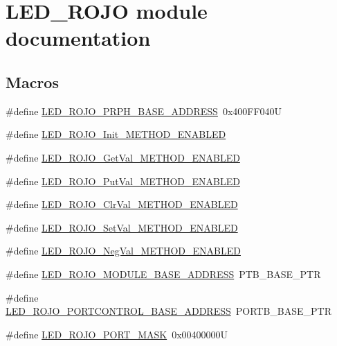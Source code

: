\hypertarget{group___l_e_d___r_o_j_o__module}{}\section{L\+E\+D\+\_\+\+R\+O\+JO module documentation}
\label{group___l_e_d___r_o_j_o__module}
\subsection*{Macros}
\begin{DoxyCompactItemize}
\item 
\#define \hyperlink{group___l_e_d___r_o_j_o__module_gadec68644cadcfc04aea84412377b3f30}{L\+E\+D\+\_\+\+R\+O\+J\+O\+\_\+\+P\+R\+P\+H\+\_\+\+B\+A\+S\+E\+\_\+\+A\+D\+D\+R\+E\+SS}~0x400\+F\+F040U
\item 
\#define \hyperlink{group___l_e_d___r_o_j_o__module_ga643f7582d425fad56e8ca0fc94a94645}{L\+E\+D\+\_\+\+R\+O\+J\+O\+\_\+\+Init\+\_\+\+M\+E\+T\+H\+O\+D\+\_\+\+E\+N\+A\+B\+L\+ED}
\item 
\#define \hyperlink{group___l_e_d___r_o_j_o__module_ga2acf59737ee845f26c9f2cb5f6fd97b7}{L\+E\+D\+\_\+\+R\+O\+J\+O\+\_\+\+Get\+Val\+\_\+\+M\+E\+T\+H\+O\+D\+\_\+\+E\+N\+A\+B\+L\+ED}
\item 
\#define \hyperlink{group___l_e_d___r_o_j_o__module_gadf6614c1a479bcee3d44b98bafdc16a7}{L\+E\+D\+\_\+\+R\+O\+J\+O\+\_\+\+Put\+Val\+\_\+\+M\+E\+T\+H\+O\+D\+\_\+\+E\+N\+A\+B\+L\+ED}
\item 
\#define \hyperlink{group___l_e_d___r_o_j_o__module_ga634d1a0c4e3ba9512cefc212b42e26ee}{L\+E\+D\+\_\+\+R\+O\+J\+O\+\_\+\+Clr\+Val\+\_\+\+M\+E\+T\+H\+O\+D\+\_\+\+E\+N\+A\+B\+L\+ED}
\item 
\#define \hyperlink{group___l_e_d___r_o_j_o__module_gaf5aa17885742bd00ce6d32388457b7d5}{L\+E\+D\+\_\+\+R\+O\+J\+O\+\_\+\+Set\+Val\+\_\+\+M\+E\+T\+H\+O\+D\+\_\+\+E\+N\+A\+B\+L\+ED}
\item 
\#define \hyperlink{group___l_e_d___r_o_j_o__module_gac52b0da514fa1a10b14164588b5d9deb}{L\+E\+D\+\_\+\+R\+O\+J\+O\+\_\+\+Neg\+Val\+\_\+\+M\+E\+T\+H\+O\+D\+\_\+\+E\+N\+A\+B\+L\+ED}
\item 
\#define \hyperlink{group___l_e_d___r_o_j_o__module_gadb5357fe29bfc41b8ddc3303ea8c0570}{L\+E\+D\+\_\+\+R\+O\+J\+O\+\_\+\+M\+O\+D\+U\+L\+E\+\_\+\+B\+A\+S\+E\+\_\+\+A\+D\+D\+R\+E\+SS}~P\+T\+B\+\_\+\+B\+A\+S\+E\+\_\+\+P\+TR
\item 
\#define \hyperlink{group___l_e_d___r_o_j_o__module_gab980668917d413e73e35cb21cbf4a046}{L\+E\+D\+\_\+\+R\+O\+J\+O\+\_\+\+P\+O\+R\+T\+C\+O\+N\+T\+R\+O\+L\+\_\+\+B\+A\+S\+E\+\_\+\+A\+D\+D\+R\+E\+SS}~P\+O\+R\+T\+B\+\_\+\+B\+A\+S\+E\+\_\+\+P\+TR
\item 
\#define \hyperlink{group___l_e_d___r_o_j_o__module_gab9f5d52fee663e6f3d572e2c7fe0576c}{L\+E\+D\+\_\+\+R\+O\+J\+O\+\_\+\+P\+O\+R\+T\+\_\+\+M\+A\+SK}~0x00400000U
\end{DoxyCompactItemize}
